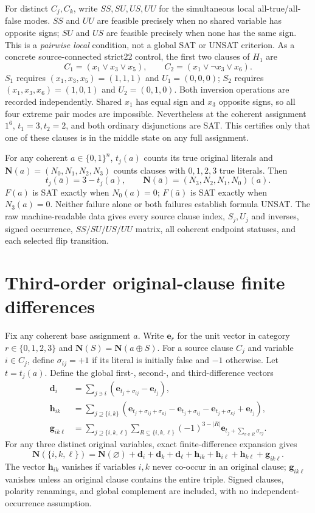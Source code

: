 \documentclass[11pt]{article}
\newcommand{\vv}[1]{\boldsymbol{#1}}
\begin{document}
For distinct $C_j,C_k$, write $SS,SU,US,UU$ for the simultaneous local all-true/all-false modes. $SS$ and $UU$ are feasible precisely when no shared variable has opposite signs; $SU$ and $US$ are feasible precisely when none has the same sign. This is a \emph{pairwise local} condition, not a global SAT or UNSAT criterion. As a concrete source-connected strict22 control, the first two clauses of $H_1$ are
\[C_1=(x_1\lor x_3\lor x_5),\qquad C_2=(x_1\lor \neg x_3\lor x_6).\]
$S_1$ requires $(x_1,x_3,x_5)=(1,1,1)$ and $U_1=(0,0,0)$; $S_2$ requires $(x_1,x_3,x_6)=(1,0,1)$ and $U_2=(0,1,0)$. Both inversion operations are recorded independently. Shared $x_1$ has equal sign and $x_3$ opposite signs, so all four extreme pair modes are impossible. Nevertheless at the coherent assignment $1^6$, $t_1=3,t_2=2$, and both ordinary disjunctions are SAT. This certifies only that one of these clauses is in the middle state on any full assignment.

For any coherent $a\in\{0,1\}^n$, $t_j(a)$ counts its true original literals and $\vv N(a)=(N_0,N_1,N_2,N_3)$ counts clauses with $0,1,2,3$ true literals. Then
\[t_j(\bar a)=3-t_j(a),\qquad \vv N(\bar a)=(N_3,N_2,N_1,N_0)(a).\]
$F(a)$ is SAT exactly when $N_0(a)=0$; $F(\bar a)$ is SAT exactly when $N_3(a)=0$. Neither failure alone or both failures establish formula UNSAT. The raw machine-readable data gives every source clause index, $S_j,U_j$ and inverses, signed occurrence, $SS/SU/US/UU$ matrix, all coherent endpoint statuses, and each selected flip transition.

\section{Third-order original-clause finite differences}
Fix any coherent base assignment $a$. Write $\vv e_r$ for the unit vector in category $r\in\{0,1,2,3\}$ and $\vv N(S)=\vv N(a\oplus S)$. For a source clause $C_j$ and variable $i\in C_j$, define $\sigma_{ij}=+1$ if its literal is initially false and $-1$ otherwise. Let $t=t_j(a)$. Define the global first-, second-, and third-difference vectors
\begin{align}
\vv d_i&=\sum_{j\ni i}(\vv e_{t_j+\sigma_{ij}}-\vv e_{t_j}),\\
\vv h_{ik}&=\sum_{j\supseteq\{i,k\}}(\vv e_{t_j+\sigma_{ij}+\sigma_{kj}}-\vv e_{t_j+\sigma_{ij}}-\vv e_{t_j+\sigma_{kj}}+\vv e_{t_j}),\\
\vv g_{ik\ell}&=\sum_{j\supseteq\{i,k,\ell\}}
\sum_{R\subseteq\{i,k,\ell\}}(-1)^{3-|R|}
\vv e_{t_j+\sum_{v\in R}\sigma_{vj}}.
\end{align}
For any three distinct original variables, exact finite-difference expansion gives
\begin{equation}\label{eq:third}
\boxed{\vv N(\{i,k,\ell\})=\vv N(\varnothing)+\vv d_i+\vv d_k+\vv d_\ell
+\vv h_{ik}+\vv h_{i\ell}+\vv h_{k\ell}+\vv g_{ik\ell}.}
\end{equation}
The vector $\vv h_{ik}$ vanishes if variables $i,k$ never co-occur in an original clause; $\vv g_{ik\ell}$ vanishes unless an original clause contains the entire triple. Signed clauses, polarity renamings, and global complement are included, with no independent-occurrence assumption.
\end{document}
